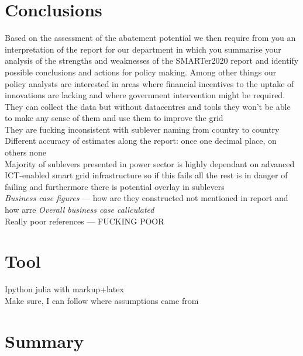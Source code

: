 \documentclass[11pt, twocolumn]{article}
\begin{document}
\section{Conclusions}
Based on the assessment of the abatement potential we then require from you an interpretation of the report for our department in which you summarise your analysis of the strengths and weaknesses of the SMARTer2020 report and identify possible conclusions and actions for policy making. Among other things our policy analysts are interested in areas where financial incentives to the uptake of innovations are lacking and where government intervention might be required.\\

They can collect the data but without datacentres and tools they won't be able to make any sense of them and use them to improve the grid\\

They are fucking inconsistent with sublever naming from country to country\\

Different accuracy of estimates along the report: once one decimal place, on others none\\

Majority of sublevers presented in power sector is highly dependant on advanced ICT-enabled smart grid infrastructure so if this fails all the rest is in danger of failing and furthermore there is potential overlay in sublevers\\

\emph{Business case figures} --- how are they constructed not mentioned in report and how arre \emph{Overall business case callculated}\\

Really poor references --- FUCKING POOR

\section{Tool}
Ipython julia with markup+latex\\
Make sure, I can follow where assumptions came from

\section{Summary}
\end{document}
